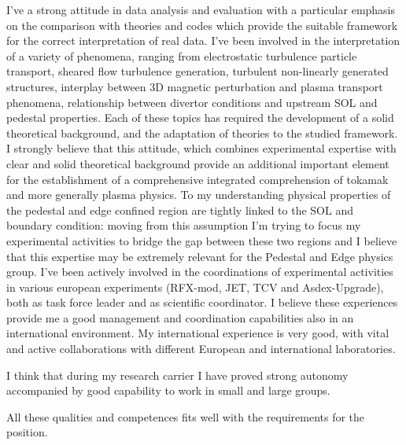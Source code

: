\documentclass[12pt,a4paper,sans]{moderncv}        %
\begin{document}
I've a strong attitude in
data analysis and evaluation with a particular emphasis on the
comparison with theories and codes which provide the suitable framework for the
correct interpretation of real data. I've been involved in
the interpretation of a variety of phenomena, ranging from electrostatic
turbulence particle transport, sheared flow turbulence generation,
turbulent non-linearly generated structures, interplay between 3D
magnetic perturbation and plasma transport phenomena, relationship
between divertor conditions and upstream SOL and pedestal properties. Each of these
topics has required the development of a solid theoretical
background, and the adaptation of theories to the studied framework. I strongly believe that this
attitude, which combines experimental expertise  with clear and solid
theoretical background provide an additional important element for the
establishment of a comprehensive integrated comprehension of
tokamak and more generally plasma physics. To my understanding 
physical properties of the pedestal and edge confined region are
tightly linked to the SOL and boundary condition: moving from this
assumption I'm trying to focus my experimental activities to bridge
the gap between these two regions and I believe that this expertise may
be extremely relevant for the Pedestal and Edge physics group. 
I've been actively involved in the coordinations of experimental
activities in various european experiments (RFX-mod, JET, TCV and
Asdex-Upgrade), both as task force leader and as scientific
coordinator. I believe these experiences
provide me a good management and coordination capabilities also in an
international environment. My international experience is very good, with vital and active
collaborations with different European and international laboratories. 

I think that during my research carrier I have proved strong autonomy
accompanied by good capability to work in small and large groups. 

All these qualities and competences fits well with the
requirements for the position. 


\makeletterclosing
\end{document}
